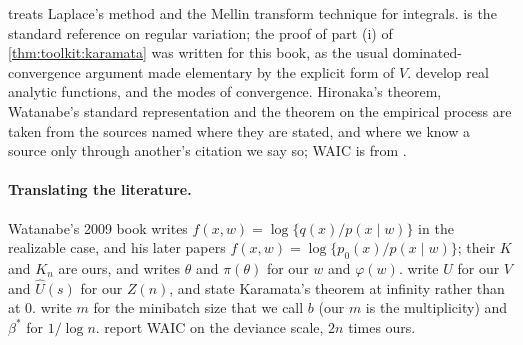 \begin{refsection}
\notesandrefs

\textcite{Wong2001} treats Laplace's method and the Mellin transform technique for integrals. \textcite{BinghamEtAl1987} is the standard reference on regular variation; the proof of part (i) of \cref{thm:toolkit:karamata} was written for this book, as the usual dominated-convergence argument made elementary by the explicit form of $V$. \textcite{KrantzParks2002} develop real analytic functions, and \textcite{vanderVaart1998} the modes of convergence. Hironaka's theorem, Watanabe's standard representation and the theorem on the empirical process are taken from the sources named where they are stated, and where we know a source only through another's citation we say so; WAIC is from \textcite{Watanabe2010}.

\paragraph{Translating the literature.} Watanabe's 2009 book writes $f(x,w)=\log\{q(x)/p(x\mid w)\}$ in the realizable case, and his later papers $f(x,w)=\log\{p_0(x)/p(x\mid w)\}$; their $K$ and $K_n$ are ours, and \textcite{Watanabe2024} writes $\theta$ and $\pi(\theta)$ for our $w$ and $\varphi(w)$. \textcite{BinghamEtAl1987} write $U$ for our $V$ and $\hat U(s)$ for our $Z(n)$, and state Karamata's theorem at infinity rather than at $0$. \textcite{LauEtAl2025} write $m$ for the minibatch size that we call $b$ (our $m$ is the multiplicity) and $\beta^*$ for $1/\log n$. \textcite{GelmanHwangVehtari2014} report WAIC on the deviance scale, $2n$ times ours.

\printchapterbib
\end{refsection}

